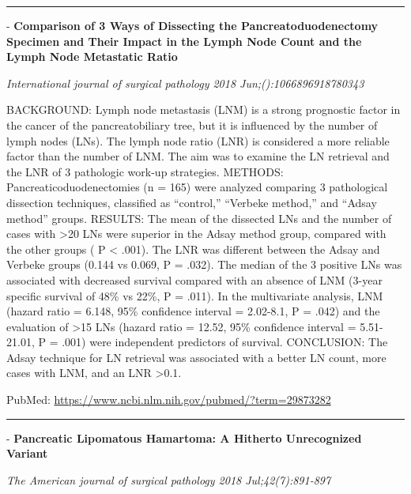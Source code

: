 \documentclass[]{article}
\begin{document}
{}

\begin{center}\rule{0.5\linewidth}{\linethickness}\end{center}

 - \textbf{Comparison of 3 Ways of Dissecting the Pancreatoduodenectomy
Specimen and Their Impact in the Lymph Node Count and the Lymph Node
Metastatic Ratio}

\emph{International journal of surgical pathology 2018
Jun;():1066896918780343}

BACKGROUND: Lymph node metastasis (LNM) is a strong prognostic factor in
the cancer of the pancreatobiliary tree, but it is influenced by the
number of lymph nodes (LNs). The lymph node ratio (LNR) is considered a
more reliable factor than the number of LNM. The aim was to examine the
LN retrieval and the LNR of 3 pathologic work-up strategies. METHODS:
Pancreaticoduodenectomies (n = 165) were analyzed comparing 3
pathological dissection techniques, classified as ``control,'' ``Verbeke
method,'' and ``Adsay method'' groups. RESULTS: The mean of the
dissected LNs and the number of cases with \textgreater{}20 LNs were
superior in the Adsay method group, compared with the other groups ( P
\textless{} .001). The LNR was different between the Adsay and Verbeke
groups (0.144 vs 0.069, P = .032). The median of the 3 positive LNs was
associated with decreased survival compared with an absence of LNM
(3-year specific survival of 48\% vs 22\%, P = .011). In the
multivariate analysis, LNM (hazard ratio = 6.148, 95\% confidence
interval = 2.02-8.1, P = .042) and the evaluation of \textgreater{}15
LNs (hazard ratio = 12.52, 95\% confidence interval = 5.51-21.01, P =
.001) were independent predictors of survival. CONCLUSION: The Adsay
technique for LN retrieval was associated with a better LN count, more
cases with LNM, and an LNR \textgreater{}0.1.

PubMed: \url{https://www.ncbi.nlm.nih.gov/pubmed/?term=29873282}

{}

{}

\begin{center}\rule{0.5\linewidth}{\linethickness}\end{center}

 - \textbf{Pancreatic Lipomatous Hamartoma: A Hitherto Unrecognized
Variant}

\emph{The American journal of surgical pathology 2018 Jul;42(7):891-897}
\end{document}
